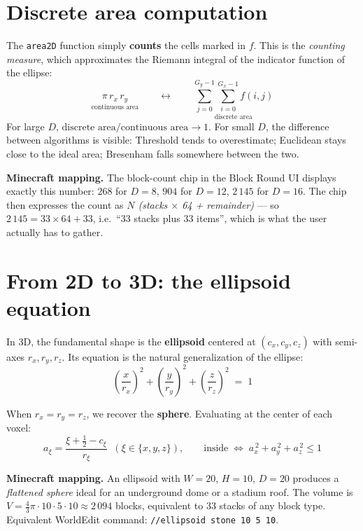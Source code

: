 \documentclass[12pt,a4paper]{scrartcl}
\newcommand{\code}[1]{\texttt{\small #1}}
\newcommand{\acc}[1]{\textcolor{accent}{\textbf{#1}}}
\newcommand{\cmd}[1]{\textcolor{earth}{\texttt{\small #1}}}
\begin{document}
\section{Discrete area computation}

The \code{area2D} function simply \acc{counts} the cells marked in $f$. This is the \emph{counting measure}, which approximates the Riemann integral of the indicator function of the ellipse:
\[
\underset{\text{continuous area}}{\pi \, r_x \, r_y}
\qquad\longleftrightarrow\qquad
\underset{\text{discrete area}}{\sum_{j=0}^{G_y-1}\sum_{i=0}^{G_x-1} f(i,j)}
\]
For large $D$, $\text{discrete area} / \text{continuous area} \to 1$. For small $D$, the difference between algorithms is visible: Threshold tends to overestimate; Euclidean stays close to the ideal area; Bresenham falls somewhere between the two.

\begin{minec}
\textbf{Minecraft mapping.} The block-count chip in the Block Round UI displays exactly this number: $268$ for $D=8$, $904$ for $D=12$, $2\,145$ for $D=16$. The chip then expresses the count as \emph{$N$ (stacks $\times$ 64 + remainder)} --- so $2\,145 = 33 \times 64 + 33$, i.e.\ \enquote{$33$ stacks plus $33$ items}, which is what the user actually has to gather.
\end{minec}

\section{From 2D to 3D: the ellipsoid equation}

In 3D, the fundamental shape is the \acc{ellipsoid} centered at $(c_x, c_y, c_z)$ with semi-axes $r_x, r_y, r_z$. Its equation is the natural generalization of the ellipse:
\[
\left(\dfrac{x}{r_x}\right)^{\!2} + \left(\dfrac{y}{r_y}\right)^{\!2} + \left(\dfrac{z}{r_z}\right)^{\!2} \;=\; 1
\]

When $r_x = r_y = r_z$, we recover the \acc{sphere}. Evaluating at the center of each voxel:
\[
a_\xi = \frac{\xi + \tfrac{1}{2} - c_\xi}{r_\xi}\;\;(\xi \in \{x,y,z\}),
\qquad
\text{inside}\;\Longleftrightarrow\;a_x^{\,2} + a_y^{\,2} + a_z^{\,2} \leq 1
\]

\begin{minec}
\textbf{Minecraft mapping.} An ellipsoid with $W=20$, $H=10$, $D=20$ produces a \emph{flattened sphere} ideal for an underground dome or a stadium roof. The volume is $V = \tfrac{4}{3}\pi \cdot 10 \cdot 5 \cdot 10 \approx 2\,094$ blocks, equivalent to $33$ stacks of any block type. Equivalent WorldEdit command: \cmd{//ellipsoid stone 10 5 10}.
\end{minec}
\end{document}
